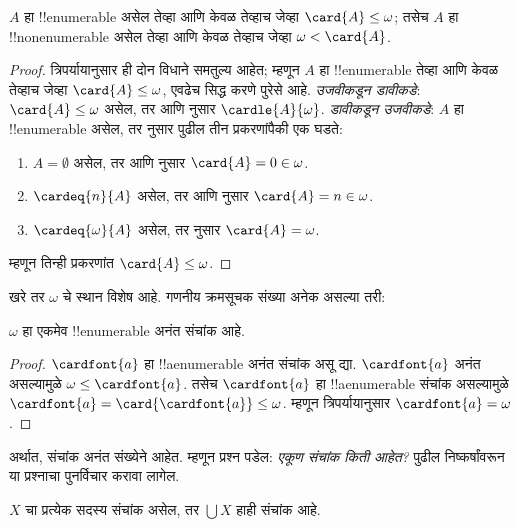 \documentclass[../../../include/open-logic-section]{subfiles}
\begin{document}
\begin{prop}
$A$ हा !!{enumerable} असेल तेव्हा आणि केवळ तेव्हाच जेव्हा $\card{A} \leq \omega$; तसेच $A$ हा !!{nonenumerable} असेल तेव्हा आणि केवळ तेव्हाच जेव्हा $\omega < \card{A}$.
\end{prop}

\begin{proof}
त्रिपर्यायानुसार ही दोन विधाने समतुल्य आहेत; म्हणून $A$ हा !!{enumerable} तेव्हा आणि केवळ तेव्हाच जेव्हा $\card{A} \leq \omega$, एवढेच सिद्ध करणे पुरेसे आहे. \emph{उजवीकडून डावीकडे}: $\card{A} \leq \omega$ असेल, तर
 आणि
 नुसार $\cardle{A}{\omega}$. \emph{डावीकडून उजवीकडे}: $A$ हा !!{enumerable} असेल, तर  नुसार पुढील तीन प्रकरणांपैकी एक घडते:
\begin{enumerate}
  \item $A = \emptyset$ असेल, तर  आणि
   नुसार $\card{A} = 0 \in \omega$.
  \item $\cardeq{n}{A}$ असेल, तर  आणि
   नुसार $\card{A} = n \in \omega$.
  \item $\cardeq{\omega}{A}$ असेल, तर  नुसार $\card{A} = \omega$.
\end{enumerate}
म्हणून तिन्ही प्रकरणांत $\card{A} \leq \omega$.
\end{proof}
\noindent
खरे तर $\omega$ चे स्थान विशेष आहे. गणनीय क्रमसूचक संख्या अनेक असल्या तरी:

\begin{cor}
$\omega$ हा एकमेव !!{enumerable} अनंत संचांक आहे.
\end{cor}

\begin{proof}
$\cardfont{a}$ हा !!a{enumerable} अनंत संचांक असू द्या. $\cardfont{a}$ अनंत असल्यामुळे $\omega \leq \cardfont{a}$. तसेच $\cardfont{a}$ हा !!a{enumerable} संचांक असल्यामुळे $\cardfont{a} =
\card{\cardfont{a}} \leq \omega$. म्हणून त्रिपर्यायानुसार $\cardfont{a} = \omega$. \end{proof}

अर्थात, संचांक अनंत संख्येने आहेत. म्हणून प्रश्न पडेल: \emph{एकूण संचांक किती आहेत?} पुढील निष्कर्षांवरून या प्रश्नाचा पुनर्विचार करावा लागेल.

\begin{prop}
$X$ चा प्रत्येक सदस्य संचांक असेल, तर $\bigcup X$ हाही संचांक आहे.
\end{prop}
\end{document}

